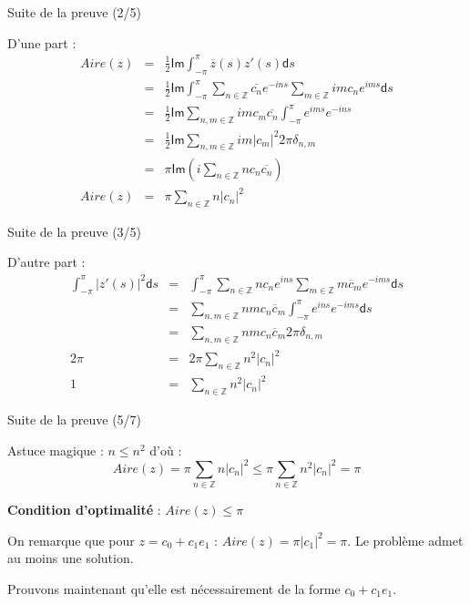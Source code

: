 \documentclass[11pt,envcountsect,aspectratio=169]{beamer} %
\newcommand{\Z}{\mathbb{Z}}
\renewcommand{\d}{\mathsf{d}}
\renewcommand{\Im}{\mathsf{Im}}
\renewcommand{\ss}{\vspace*{\baselineskip}}
\begin{document}
\begin{frame}{Suite de la preuve (2/5)}

    D'une part :
    \begin{eqnarray*}
    Aire(z) &=& \frac{1}{2} \Im \int_{-\pi}^{\pi}{\overline{z}(s) z'(s) \d s} \\
    &=& \frac{1}{2} \Im \int_{-\pi}^{\pi}{ \sum_{n\in \Z}{\overline{c_n} e^{-ins}} \sum_{m\in \Z}{imc_n e^{ims}}}\d s\\
    &=& \frac{1}{2} \Im \sum_{n,m\in \Z}{ im c_m \overline{c_n} \int_{-\pi}^{\pi}{e^{ims}e^{-ins}} } \\
    &=& \frac{1}{2} \Im \sum_{n,m\in \Z}{ im |c_m|^2 2\pi \delta_{n,m} } \\
    &=& \pi \Im\left( i\textstyle\sum_{n\in \Z}{ n c_n \overline{c_n}}\right) \\
    Aire(z) &=&  \pi\sum_{n\in\Z}n|c_n|^2
    \end{eqnarray*}

\end{frame}

\begin{frame}{Suite de la preuve (3/5)}

    D'autre part :
    \begin{eqnarray*}
    \int_{-\pi}^\pi |z'(s)|^2\d s &=& \int_{-\pi}^{\pi}{ \sum_{n \in \Z}{n c_n e^{ins}} \sum_{m \in \Z}{m \overline{c}_m e^{-ims}} \d s}\\
    &=& \sum_{n,m \in \Z}{ nm c_n \overline{c}_m \int_{-\pi}^{\pi}{ e^{ins} e^{-ims} \d s} } \\
    &=& \sum_{n,m \in \Z}{ nm c_n \overline{c}_m 2\pi \delta_{n,m} } \\
    2\pi &=& 2\pi \sum_{n\in\Z}n^2|c_n|^2 \\
    1 &=& \sum_{n\in\Z}n^2|c_n|^2
    \end{eqnarray*}
    
\end{frame}

\begin{frame}{Suite de la preuve (5/7)}

    Astuce magique : $n\leqslant n^2$ d'où :
    \[ Aire(z) = \pi \sum_{n\in \Z}{n|c_n|^2} \leqslant \pi \sum_{n\in \Z}{n^2|c_n|^2} = \pi\]
    \ss

    \textbf{Condition d'optimalité} : $Aire(z) \leqslant \pi$
    \ss
    
    On remarque que pour $z=c_0+c_1e_1$ : $Aire(z) = \pi |c_1|^2 = \pi$. Le problème admet au moins une solution.
    
    Prouvons maintenant qu'elle est nécessairement de la forme $c_0+c_1e_1$.
    
\end{frame}
\end{document}
